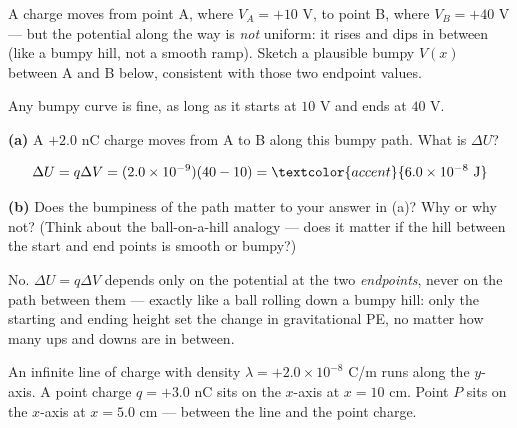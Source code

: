\documentclass[12pt]{article}
\newcommand{\ANS}[1]{\textcolor{accent}{#1}}
\begin{document}

\prob A charge moves from point A, where $V_A=+10$ V, to point B, where $V_B=+40$ V
--- but the potential along the way is \emph{not} uniform: it rises and dips in
between (like a bumpy hill, not a smooth ramp). Sketch a plausible bumpy $V(x)$ between
A and B below, consistent with those two endpoint values.

\begin{center}
\end{center}
\ANS{Any bumpy curve is fine, as long as it starts at $10$ V and ends at $40$ V.}

\textbf{(a)} A $+2.0$ nC charge moves from A to B along this bumpy path. What is
$\Delta U$?

\[
\Delta U = q\Delta V = (2.0\times10^{-9})(40-10) = \ANS{6.0\times10^{-8}\text{ J}}
\]

\textbf{(b)} Does the bumpiness of the path matter to your answer in (a)? Why or why
not? (Think about the ball-on-a-hill analogy --- does it matter if the hill between
the start and end points is smooth or bumpy?)

\ANS{No.} $\Delta U=q\Delta V$ depends only on the potential at the two
\emph{endpoints}, never on the path between them --- exactly like a ball rolling
down a bumpy hill: only the starting and ending height set the change in
gravitational PE, no matter how many ups and downs are in between.

\clearpage

\prob An infinite line of charge with density $\lambda=+2.0\times10^{-8}$ C/m runs
along the $y$-axis. A point charge $q=+3.0$ nC sits on the $x$-axis at $x=10$ cm.
Point $P$ sits on the $x$-axis at $x=5.0$ cm --- between the line and the point
charge.
\end{document}
